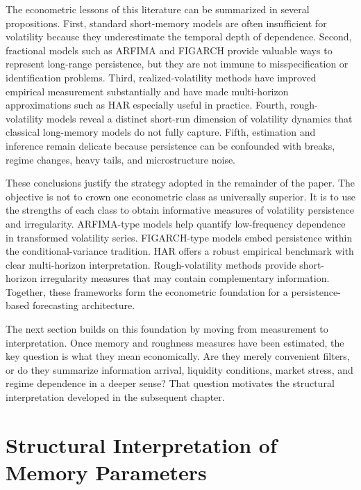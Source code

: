 \documentclass[12pt]{article}
\begin{document}
The econometric lessons of this literature can be summarized in several propositions. First, standard short-memory models are often insufficient for volatility because they underestimate the temporal depth of dependence. Second, fractional models such as ARFIMA and FIGARCH provide valuable ways to represent long-range persistence, but they are not immune to misspecification or identification problems. Third, realized-volatility methods have improved empirical measurement substantially and have made multi-horizon approximations such as HAR especially useful in practice. Fourth, rough-volatility models reveal a distinct short-run dimension of volatility dynamics that classical long-memory models do not fully capture. Fifth, estimation and inference remain delicate because persistence can be confounded with breaks, regime changes, heavy tails, and microstructure noise.

These conclusions justify the strategy adopted in the remainder of the paper. The objective is not to crown one econometric class as universally superior. It is to use the strengths of each class to obtain informative measures of volatility persistence and irregularity. ARFIMA-type models help quantify low-frequency dependence in transformed volatility series. FIGARCH-type models embed persistence within the conditional-variance tradition. HAR offers a robust empirical benchmark with clear multi-horizon interpretation. Rough-volatility methods provide short-horizon irregularity measures that may contain complementary information. Together, these frameworks form the econometric foundation for a persistence-based forecasting architecture.

The next section builds on this foundation by moving from measurement to interpretation. Once memory and roughness measures have been estimated, the key question is what they mean economically. Are they merely convenient filters, or do they summarize information arrival, liquidity conditions, market stress, and regime dependence in a deeper sense? That question motivates the structural interpretation developed in the subsequent chapter.



\section{Structural Interpretation of Memory Parameters}
\label{sec:structural}
\end{document}
